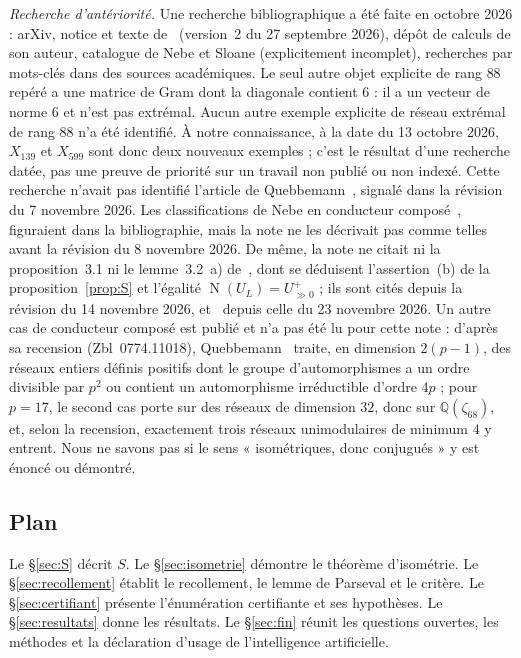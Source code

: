 \documentclass[11pt,a4paper]{amsart}
\theoremstyle{plain}
\theoremstyle{definition}
\numberwithin{equation}{section}
\newcommand{\Q}{\mathbb{Q}}
\DeclareMathOperator{\Nm}{N}
\newcommand{\Upp}{U^{+}_{\gg0}}
\begin{document}
\emph{Recherche d'antériorité.} Une recherche bibliographique a été faite en octobre 2026 : arXiv, notice et texte de~\cite{Sak26} (version~2 du 27 septembre 2026), dépôt de calculs de son auteur, catalogue de Nebe et Sloane (explicitement incomplet), recherches par mots-clés dans des sources académiques. Le seul autre objet explicite de rang $88$ repéré a une matrice de Gram dont la diagonale contient $6$ : il a un vecteur de norme $6$ et n'est pas extrémal. Aucun autre exemple explicite de réseau extrémal de rang $88$ n'a été identifié. À notre connaissance, à la date du 13 octobre 2026, $X_{139}$ et $X_{599}$ sont donc deux nouveaux exemples ; c'est le résultat d'une recherche datée, pas une preuve de priorité sur un travail non publié ou non indexé. Cette recherche n'avait pas identifié l'article de Quebbemann~\cite{Que81}, signalé dans la révision du 7 novembre 2026. Les classifications de Nebe en conducteur composé~\cite[th.~5.3]{Neb13}, \cite[th.~4.5]{Neb16} figuraient dans la bibliographie, mais la note ne les décrivait pas comme telles avant la révision du 8 novembre 2026. De même, la note ne citait ni la proposition~3.1 ni le lemme~3.2~a) de~\cite{Bay84}, dont se déduisent l'assertion~(b) de la proposition~\ref{prop:S} et l'égalité $\Nm(U_L)=\Upp$ ; ils sont cités depuis la révision du 14 novembre 2026, et~\cite{BFS05} depuis celle du 23 novembre 2026. Un autre cas de conducteur composé est publié et n'a pas été lu pour cette note : d'après sa recension (Zbl~0774.11018), Quebbemann~\cite{Que92} traite, en dimension $2(p-1)$, des réseaux entiers définis positifs dont le groupe d'automorphismes a un ordre divisible par $p^2$ ou contient un automorphisme irréductible d'ordre $4p$ ; pour $p=17$, le second cas porte sur des réseaux de dimension $32$, donc sur $\Q(\zeta_{68})$, et, selon la recension, exactement trois réseaux unimodulaires de minimum $4$ y entrent. Nous ne savons pas si le sens « isométriques, donc conjugués » y est énoncé ou démontré.

\subsection*{Plan}
Le \S\ref{sec:S} décrit $S$. Le \S\ref{sec:isometrie} démontre le théorème d'isométrie. Le \S\ref{sec:recollement} établit le recollement, le lemme de Parseval et le critère. Le \S\ref{sec:certifiant} présente l'énumération certifiante et ses hypothèses. Le \S\ref{sec:resultats} donne les résultats. Le \S\ref{sec:fin} réunit les questions ouvertes, les méthodes et la déclaration d'usage de l'intelligence artificielle.
\end{document}

